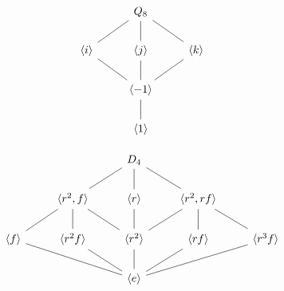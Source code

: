\documentclass{ximera}
\begin{document}
\[
\begin{tikzcd}
       & Q_8 \ar[rd,-] \ar[d,-] \ar[ld,-] &       \\
\<i\>  \ar[rd,-] & \<j\>  \ar[d,-]     & \<k\> \ar[ld,-]\\
&\< -1\> \ar[d,-]&        \\   
       & \<1\> &
\end{tikzcd}
\]


\[
\begin{tikzcd}
   &    & D_4 \ar[rd,-] \ar[d,-] \ar[ld,-] &       \\
&\<r^2,f\>  \ar[rd,-] \ar[d,-] \ar[ld,-]& \<r \>  \ar[d,-]     & \<r^2,rf\> \ar[ld,-] \ar[d,-] \ar[rd,-]\\
\<f\>\ar[rrd,-]& \<r^2f\> \ar[rd,-]&\< r^2\> \ar[d,-]  &   \<rf\> \ar[ld,-]& \<r^3f\>\ar[lld,-]     \\   
  &     & \<e\> &  &
\end{tikzcd}
\]
\end{document}
